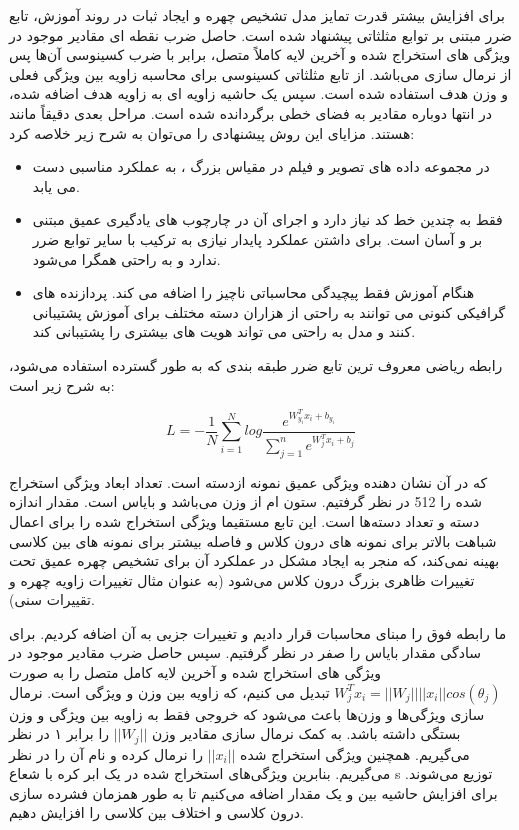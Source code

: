 \noindent
برای افزایش بیشتر قدرت تمایز مدل تشخیص چهره و ایجاد ثبات در روند آموزش، تابع ضرر مبتنی بر توابع مثلثاتی پیشنهاد شده است. حاصل ضرب نقطه ای مقادیر موجود در ویژگی های استخراج شده و آخرین لایه کاملاً متصل، برابر با ضرب کسینوسی آن‌ها پس از نرمال سازی می‌باشد‌. از تابع مثلثاتی کسینوسی برای محاسبه زاویه بین ویژگی فعلی و وزن هدف استفاده شده ‌است. سپس یک حاشیه زاویه ای به زاویه هدف اضافه شده‌، در انتها دوباره مقادیر به فضای خطی برگردانده شده است. مراحل بعدی دقیقاً مانند  هستند. مزایای این روش پیشنهادی را می‌توان به شرح زیر خلاصه کرد:
\begin{itemize}
 \item
در مجموعه داده های تصویر و فیلم در مقیاس بزرگ ، به عملکرد مناسبی دست می یابد.
 \item
فقط به چندین خط کد نیاز دارد و اجرای آن در چارچوب های یادگیری عمیق مبتنی بر  و  آسان است. برای داشتن عملکرد پایدار نیازی به ترکیب با سایر توابع ضرر ندارد و به راحتی همگرا می‌شود.
 \item
هنگام آموزش فقط پیچیدگی محاسباتی ناچیز را اضافه می کند. پردازنده های گرافیکی کنونی می توانند به راحتی از هزاران دسته مختلف برای آموزش پشتیبانی کنند و مدل به راحتی می تواند هویت های بیشتری را پشتیبانی کند.
\end{itemize}
 
\noindent
رابطه ریاضی  معروف ترین تابع ضرر طبقه بندی که به طور گسترده استفاده می‌شود، به شرح زیر است:

\begin{equation}\label{eq3-14}
L= - \frac{1}{N} \sum_{i=1}^{N} log \frac{e^{{W_{y_i}^T} x_i + b_{y_i}}}{\sum_{j=1}^{n} e^{{W_j^T} x_i + b_j}} 
\end{equation}

\noindent
که در آن  نشان دهنده ویژگی عمیق نمونه  ازدسته  است. تعداد ابعاد ویژگی استخراج شده را 512 در نظر گرفتیم.  ستون   ام از وزن  می‌باشد و  بایاس است. مقدار اندازه دسته و  تعداد دسته‌ها است. این تابع مستقیما ویژگی استخراج شده را برای اعمال شباهت بالاتر برای نمونه های درون کلاس و فاصله بیشتر برای نمونه های بین کلاسی بهینه نمی‌کند، که منجر به ایجاد مشکل در عملکرد آن برای تشخیص چهره عمیق تحت تغییرات ظاهری بزرگ درون کلاس می‌شود (به عنوان مثال تغییرات زاویه چهره و تقییرات سنی).

\noindent
ما رابطه فوق را مبنای محاسبات قرار دادیم و تغییرات جزیی به آن اضافه کردیم. برای سادگی مقدار بایاس را صفر در نظر گرفتیم. سپس حاصل ضرب مقادیر موجود در ویژگی های استخراج شده و آخرین لایه کامل متصل را به صورت
$W_j^T x_i = ||W_j|| ||x_i|| cos(θ_j)$
تبدیل می کنیم، که  زاویه بین وزن  و ویژگی  است. نرمال سازی ویژگی‌ها و وزن‌ها باعث می‌شود که خروجی فقط به زاویه بین ویژگی و وزن بستگی داشته باشد. به کمک نرمال سازی مقادیر وزن $||W_j||$ را برابر ۱ در نظر می‌گیریم. همچنین ویژگی استخراج شده $||x_i||$ را نرمال کرده و نام آن را  در نظر می‌گیریم. ‌‌‌بنابرین ویژگی‌های استخراج شده در یک ابر کره با شعاع s توزیع می‌شوند. برای افزایش حاشیه بین  و  یک مقدار اضافه می‌کنیم تا به طور همزمان فشرده سازی درون کلاسی و اختلاف بین کلاسی را افزایش دهیم.

